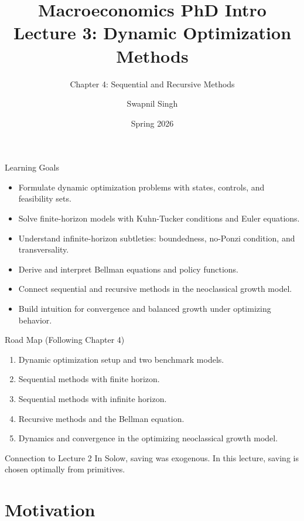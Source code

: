 \documentclass[aspectratio=169,10pt]{beamer}
\title{Macroeconomics PhD Intro\\Lecture 3: Dynamic Optimization Methods}
\subtitle{Chapter 4: Sequential and Recursive Methods}
\author{Swapnil Singh}
\institute{Lietuvos Bankas \and Kaunas University of Technology}
\date{Spring 2026}
\begin{document}
\begin{frame}
  \titlepage
\end{frame}

\begin{frame}{Learning Goals}
\begin{itemize}
  \item Formulate dynamic optimization problems with states, controls, and feasibility sets.
  \item Solve finite-horizon models with Kuhn-Tucker conditions and Euler equations.
  \item Understand infinite-horizon subtleties: boundedness, no-Ponzi condition, and transversality.
  \item Derive and interpret Bellman equations and policy functions.
  \item Connect sequential and recursive methods in the neoclassical growth model.
  \item Build intuition for convergence and balanced growth under optimizing behavior.
\end{itemize}
\end{frame}

\begin{frame}{Road Map (Following Chapter 4)}
\begin{enumerate}
  \item Dynamic optimization setup and two benchmark models.
  \item Sequential methods with finite horizon.
  \item Sequential methods with infinite horizon.
  \item Recursive methods and the Bellman equation.
  \item Dynamics and convergence in the optimizing neoclassical growth model.
\end{enumerate}

\begin{block}{Connection to Lecture 2}
In Solow, saving was exogenous. In this lecture, saving is chosen optimally from primitives.
\end{block}
\end{frame}

\section{Motivation}
\end{document}
